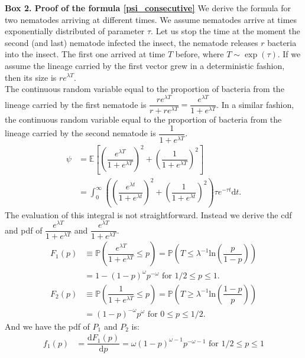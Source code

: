 \documentclass[10pt]{article}
\newcommand{\ud}{{\mathrm{d}}}
\newcommand{\pr}{{\mathbb{P}}}
\begin{document}
\begin{boxframe}
\label{box_PI_simultaneous}
\begin{multicols}{2}
\textbf{Box 2. Proof of  the formula \eqref{psi_consecutive}}
We derive the formula for two nematodes arriving at different times. We assume nematodes arrive at times exponentially distributed of parameter $ \tau$. Let us stop the time at the moment the second (and last) nematode infected the insect, the nematode releases $r$ bacteria into the insect. The first one arrived at time $T$ before, where $T\sim \exp ( \tau)$. If we assume the lineage carried by the first vector grew in a deterministic fashion, then its size is $r e^{\lambda  T}$. \\
  The continuous random variable equal to the proportion of bacteria from the lineage carried by the first nematode is $\dfrac{r e^{\lambda T}}{r+re^{\lambda T}}=\dfrac{ e^{\lambda T}}{1+e^{\lambda T}}$. In a similar fashion, the continuous random variable equal to the proportion of bacteria from the lineage carried by the second nematode is $\dfrac{1}{1+e^{\lambda T}}$.
  \begin{align}
  \psi  &=\mathbb{E} \left[ \left( \dfrac{ e^{\lambda T}}{1+e^{\lambda T}} \right)^2+\left( \dfrac{1}{1+e^{\lambda T}} \right)^2 \right] \\
  &=\int_0^\infty \left( \left( \dfrac{ e^{\lambda t}}{1+e^{\lambda t}} \right)^2 + \left( \dfrac{1}{1+e^{\lambda t}} \right)^2 \right) \tau e^{ -\tau t } \ud t.
  \end{align}
  The evaluation of this integral is not straightforward. Instead we derive the cdf and pdf of $\dfrac{ e^{\lambda T}}{1+e^{\lambda T}}$ and $\dfrac{ e^{\lambda T}}{1+e^{\lambda T}}$.
  \begin{align}
  F_1(p) &\equiv \pr \left(\dfrac{e^{\lambda T}}{1+e^{\lambda T}} \leq p\right)= \pr \left(T \leq \lambda^{-1} \mathrm{ln}\left( \dfrac{p}{1-p} \right) \right) \\
  &= 1-(1-p)^{\omega} p^{-\omega} \text{ for } 1/2 \leq p \leq 1.
  \end{align}  
  \begin{align}
  F_2(p) &\equiv \pr \left(\dfrac{1}{1+e^{\lambda T}} \leq p\right) = \pr \left(T \geq \lambda^{-1} \mathrm{ln}\left( \dfrac{1-p}{p} \right) \right) \\
  &= (1-p)^{-\omega} p^\omega \text{ for } 0 \leq p \leq 1/2.
  \end{align}
  And we have the pdf of $P_1$ and $P_2$ is:
  \begin{align}
  f_1(p) &= \dfrac{ \ud F_1(p) }{ \ud p} =  \omega (1-p)^{\omega-1} p^{-\omega-1}  \text{ for } 1/2 \leq p \leq 1\\

\end{align}
\end{multicols}
\end{boxframe}
\end{document}
